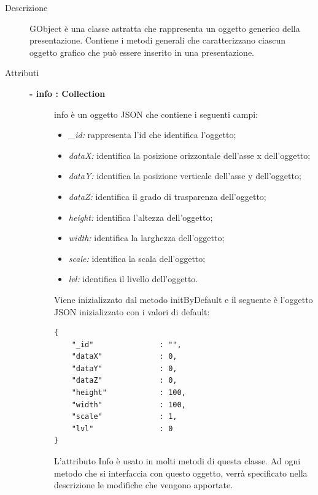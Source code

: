 \begin{description}
\item[Descrizione] \hfill
	GObject è una classe astratta che rappresenta un oggetto generico della presentazione. Contiene i metodi generali che caratterizzano ciascun oggetto grafico che può essere inserito in una presentazione.
	
\item[Attributi] \hfill
	\begin{description}
		\item[\textbf{- info : Collection			}] \hfill
			info è un oggetto JSON che contiene i seguenti campi:
				\begin{itemize}
					\item \textit{\_id:} rappresenta l'id che identifica l'oggetto;
					\item \textit{dataX:} identifica la posizione orizzontale dell'asse x dell'oggetto;
					\item \textit{dataY:} identifica la posizione verticale dell'asse y dell'oggetto;
					\item \textit{dataZ:} identifica il grado di trasparenza dell'oggetto; %
					\item \textit{height:} identifica l'altezza dell'oggetto;
					\item \textit{width:} identifica la larghezza dell'oggetto;
					\item \textit{scale:} identifica la scala dell'oggetto; %
					\item \textit{lvl:} identifica il livello dell'oggetto. %
				\end{itemize}
			
			Viene inizializzato dal metodo initByDefault e il seguente è l'oggetto JSON inizializzato con i valori di default:
\begin{lstlisting}
{
    "_id"               : "",
    "dataX"             : 0,
    "dataY"             : 0,
    "dataZ"             : 0,
    "height"            : 100,
    "width"             : 100,
    "scale"             : 1,
    "lvl"               : 0
}
\end{lstlisting}					
                 L'attributo Info è usato in molti metodi di questa classe. Ad ogni metodo che si interfaccia con questo oggetto, verrà specificato nella descrizione le modifiche che vengono apportate. 
		
	\end{description}
	

\end{description}
